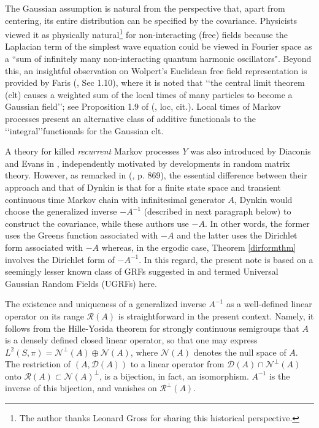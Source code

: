 \documentclass[11pt]{article}
\numberwithin{equation}{section}
\theoremstyle{definition}
\theoremstyle{remark}
\theoremstyle{definition}
\begin{document}
 The 
Gaussian assumption is natural from the perspective that, apart
from centering, its entire distribution can be specified by the covariance.  Physicists viewed it as physically natural\footnote{The author thanks Leonard Gross for sharing this historical perspective.} 
for non-interacting (free) fields because the 
 Laplacian term of the simplest wave equation
could be viewed in Fourier space as a ``sum of infinitely many non-interacting quantum harmonic oscillators".
 Beyond this,
an insightful observation on 
 Wolpert's \cite{wolpert} Euclidean free field representation 
 is provided by Faris
 (\cite{Faris}, Sec 1.10), 
where it is noted that 
\lq\lq the central limit theorem (clt) causes 
a weighted sum of the local times of many particles 
to become a Gaussian field\rq\rq; see Proposition 1.9
of (\cite{Faris}, loc, cit.).  
Local times of 
Markov processes present 
 an alternative class of additive functionals to the \lq\lq integral\rq\rq functionals 
 for the Gaussian clt. 
  
 A theory for 
killed {\it recurrent} Markov processes $Y$ was also 
introduced by Diaconis and Evans in \cite{DiaconisEvans}, independently
motivated by developments in 
random matrix theory.  However, as 
remarked in (\cite{DiaconisEvans}, p. 869), the essential
difference between their approach and that of
Dynkin is that for a finite
state space and transient continuous time
Markov chain with infinitesimal generator
$A$, Dynkin would choose
the generalized inverse $-A^{-1}$ (described in next
paragraph below) to construct
the covariance,  while these authors use 
 $-A$. In other words, the former uses the 
Greens function associated with $-A$
and the latter uses the Dirichlet form 
associated with $-A$ whereas, in the 
ergodic case, Theorem \ref{dirformthm}
involves the Dirichlet form of $-A^{-1}$.
In this regard, the present note is based on a seemingly lesser known
class of GRFs suggested in \cites{RBfclt,DiaconisEvans}
and termed Universal Gaussian Random Fields
(UGRFs) here.  

The existence and uniqueness 
of  a generalized inverse
 $ A^{-1}$ as a well-defined linear
operator on its range ${\mathcal R}({ A})$ is 
straightforward in the present context.
Namely,
it follows from the
Hille-Yosida theorem for strongly continuous
semigroups that $ A$ is a densely defined
closed linear operator, so that one may express
 $L^2(S,\pi) =\mathcal{N}^\perp({ A})\oplus\mathcal{N}({ A})$,
 where $\mathcal{N}(A)$ denotes the null space of $A$.  
 The restriction of
$(A,\mathcal{D}(A))$ to
  a linear operator from 
$\mathcal{D}(A)\cap \mathcal{N}^\perp({ A})$
onto $\mathcal{R}(A)\subset\mathcal{N}({ A})^\perp$, 
 is a bijection, in fact, an isomorphism.  
 $ A^{-1}$ is the inverse of this bijection, and vanishes
 on $\mathcal{R}^\perp(A)$.
 
\end{document}
